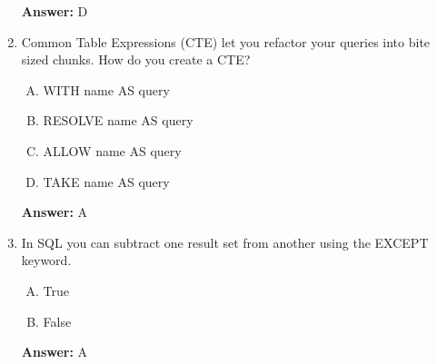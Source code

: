 \documentclass[12pt]{article}
\begin{document}
\begin{enumerate}[1.]
    \bigskip

    \textbf{Answer:} D

    \item

    Common Table Expressions (CTE) let you refactor your queries into bite sized
    chunks. How do you create a CTE?

    \bigskip

    \begin{enumerate}[A.]
        \item WITH name AS { query }
        \item RESOLVE name AS { query }
        \item ALLOW name AS { query }
        \item TAKE name AS { query }
    \end{enumerate}

    \bigskip

    \textbf{Answer:} A

    \item

    In SQL you can subtract one result set from another using the EXCEPT keyword.

    \bigskip

    \begin{enumerate}[A.]
        \item True
        \item False
    \end{enumerate}

    \bigskip

    \textbf{Answer:} A

\end{enumerate}
\end{document}
